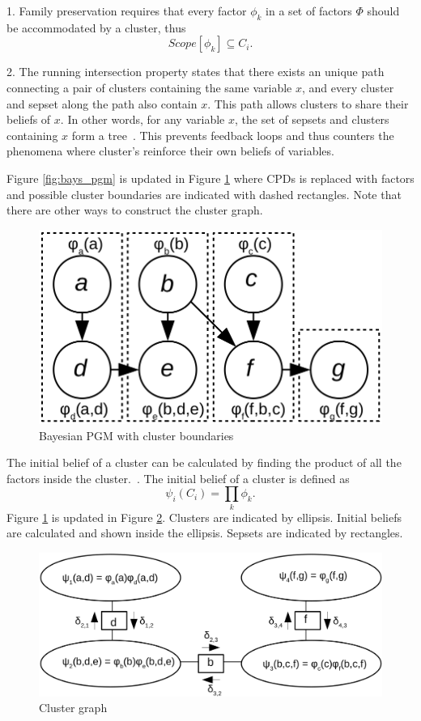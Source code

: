 \documentclass[12pt,oneside,openany,a4paper, %
afrikaans,english,
]{memoir}
\numberwithin{equation}{chapter}
\begin{document}
1. Family preservation requires that every factor $\phi_k$ in a set of factors $\Phi$ should be accommodated by a cluster, thus
\begin{equation}
Scope[{\phi}_k] \subseteq C_i.
\end{equation}

2. The running intersection property states that there exists an unique path connecting a pair of clusters containing the same variable $x$, and every cluster and sepset along the path also contain $x$. This path allows clusters to share their beliefs of $x$. In other words, for any variable $x$, the set of sepsets and clusters containing $x$ form a tree~\citep{koller}. This prevents feedback loops and thus counters the phenomena where cluster's reinforce their own beliefs of variables.

Figure \ref{fig:bays_pgm} is updated in Figure \ref{fig:cluster_bound} where CPDs is replaced with factors and possible cluster boundaries are indicated with dashed rectangles. Note that there are other ways to construct the cluster graph.
\begin{figure}[H]
  \includegraphics[width=0.6\linewidth]{Figures/cluster_divisions.png}
  \centering
  \caption{Bayesian PGM with cluster boundaries}
  \label{fig:cluster_bound}
\end{figure}

The initial belief of a cluster can be calculated by finding the product of all the factors inside the cluster.~\citep{koller}. The initial belief of a cluster is defined as
\begin{equation}
\psi_i(C_i) = \prod_{k}\phi_k.
\end{equation}
Figure \ref{fig:cluster_bound} is updated in Figure \ref{fig:clustergraph}. Clusters are indicated by ellipsis. Initial beliefs are calculated and shown inside the ellipsis. Sepsets are indicated by rectangles.
\begin{figure}[H]
  \includegraphics[width=0.7\linewidth]{Figures/clustergraph.png}
  \centering
  \caption{Cluster graph}
  \label{fig:clustergraph}
\end{figure}
\end{document}
